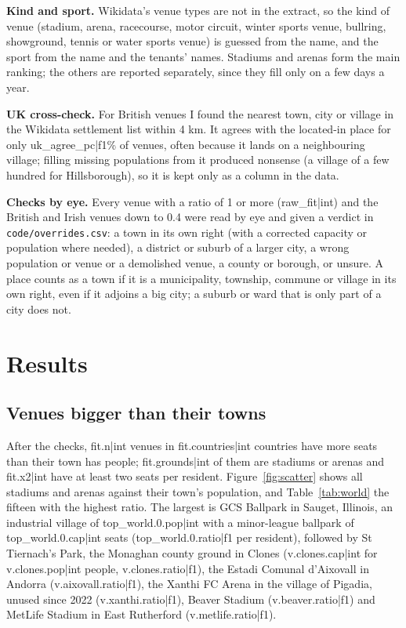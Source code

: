 \documentclass[11pt,a4paper]{article}
\begin{document}
\textbf{Kind and sport.} Wikidata's venue types are not in the extract, so the kind of venue (stadium, arena, racecourse, motor circuit, winter sports venue, bullring, showground, tennis or water sports venue) is guessed from the name, and the sport from the name and the tenants' names. Stadiums and arenas form the main ranking; the others are reported separately, since they fill only on a few days a year.

\textbf{UK cross-check.} For British venues I found the nearest town, city or village in the Wikidata settlement list within 4 km. It agrees with the located-in place for only {{uk_agree_pc|f1}}\% of venues, often because it lands on a neighbouring village; filling missing populations from it produced nonsense (a village of a few hundred for Hillsborough), so it is kept only as a column in the data.

\textbf{Checks by eye.} Every venue with a ratio of 1 or more ({{raw_fit|int}}) and the British and Irish venues down to 0.4 were read by eye and given a verdict in \texttt{code/overrides.csv}: a town in its own right (with a corrected capacity or population where needed), a district or suburb of a larger city, a wrong population or venue or a demolished venue, a county or borough, or unsure. A place counts as a town if it is a municipality, township, commune or village in its own right, even if it adjoins a big city; a suburb or ward that is only part of a city does not.

\section{Results}
\subsection{Venues bigger than their towns}
After the checks, {{fit.n|int}} venues in {{fit.countries|int}} countries have more seats than their town has people; {{fit.grounds|int}} of them are stadiums or arenas and {{fit.x2|int}} have at least two seats per resident. Figure~\ref{fig:scatter} shows all stadiums and arenas against their town's population, and Table~\ref{tab:world} the fifteen with the highest ratio. The largest is GCS Ballpark in Sauget, Illinois, an industrial village of {{top_world.0.pop|int}} with a minor-league ballpark of {{top_world.0.cap|int}} seats ({{top_world.0.ratio|f1}} per resident), followed by St Tiernach's Park, the Monaghan county ground in Clones ({{v.clones.cap|int}} for {{v.clones.pop|int}} people, {{v.clones.ratio|f1}}), the Estadi Comunal d'Aixovall in Andorra ({{v.aixovall.ratio|f1}}), the Xanthi FC Arena in the village of Pigadia, unused since 2022 ({{v.xanthi.ratio|f1}}), Beaver Stadium ({{v.beaver.ratio|f1}}) and MetLife Stadium in East Rutherford ({{v.metlife.ratio|f1}}).
\end{document}
